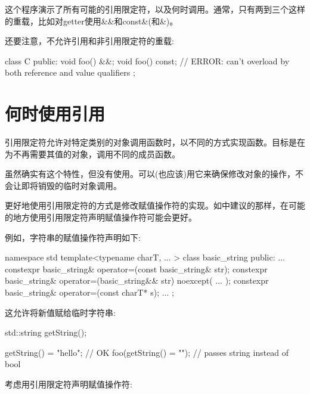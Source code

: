 这个程序演示了所有可能的引用限定符，以及何时调用。通常，只有两到三个这样的重载，比如对getter使用\&\&和const\&(和\&)。\par

还要注意，不允许引用和非引用限定符的重载:\par

\begin{codebox}[cpp]
class C {
public:
  void foo() &&;
  void foo() const; // ERROR: can’t overload by both reference and value qualifiers
};
\end{codebox}


\section{何时使用引用}

引用限定符允许对特定类别的对象调用函数时，以不同的方式实现函数。目标是在为不再需要其值的对象，调用不同的成员函数。\par

虽然确实有这个特性，但没有使用。可以(也应该)用它来确保修改对象的操作，不会让即将销毁的临时对象调用。\par


更好地使用引用限定符的方式是修改赋值操作符的实现。如中建议的那样，在可能的地方使用引用限定符声明赋值操作符可能会更好。\par

例如，字符串的赋值操作符声明如下:\par

\begin{codebox}[cpp]
namespace std {
  template<typename charT, ... >
  class basic_string {
  public:
    ...
    constexpr basic_string& operator=(const basic_string& str);
    constexpr basic_string& operator=(basic_string&& str) noexcept( ... );
    constexpr basic_string& operator=(const charT* s);
    ...
  };
}
\end{codebox}

这允许将新值赋给临时字符串:\par

\begin{codebox}[cpp]
std::string getString();

getString() = "hello"; // OK
foo(getString() = ""); // passes string instead of bool
\end{codebox}

考虑用引用限定符声明赋值操作符:\par

